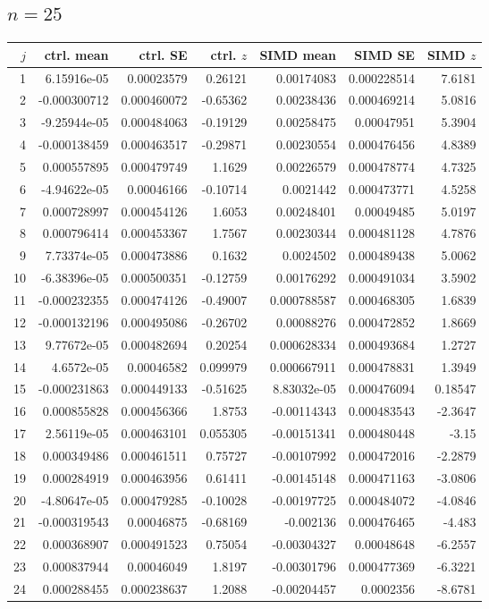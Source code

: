 \documentclass[10pt]{article}
\begin{document}
\subsection{$n=25$}
\scriptsize
\begin{longtable}{rrrrrrr}
\toprule
$j$ & ctrl. mean & ctrl. SE & ctrl. $z$ & SIMD mean & SIMD SE & SIMD $z$\\
\midrule\endhead
1 & 6.15916e-05 & 0.00023579 & 0.26121 & 0.00174083 & 0.000228514 & 7.6181 \\
2 & -0.000300712 & 0.000460072 & -0.65362 & 0.00238436 & 0.000469214 & 5.0816 \\
3 & -9.25944e-05 & 0.000484063 & -0.19129 & 0.00258475 & 0.00047951 & 5.3904 \\
4 & -0.000138459 & 0.000463517 & -0.29871 & 0.00230554 & 0.000476456 & 4.8389 \\
5 & 0.000557895 & 0.000479749 & 1.1629 & 0.00226579 & 0.000478774 & 4.7325 \\
6 & -4.94622e-05 & 0.00046166 & -0.10714 & 0.0021442 & 0.000473771 & 4.5258 \\
7 & 0.000728997 & 0.000454126 & 1.6053 & 0.00248401 & 0.00049485 & 5.0197 \\
8 & 0.000796414 & 0.000453367 & 1.7567 & 0.00230344 & 0.000481128 & 4.7876 \\
9 & 7.73374e-05 & 0.000473886 & 0.1632 & 0.0024502 & 0.000489438 & 5.0062 \\
10 & -6.38396e-05 & 0.000500351 & -0.12759 & 0.00176292 & 0.000491034 & 3.5902 \\
11 & -0.000232355 & 0.000474126 & -0.49007 & 0.000788587 & 0.000468305 & 1.6839 \\
12 & -0.000132196 & 0.000495086 & -0.26702 & 0.00088276 & 0.000472852 & 1.8669 \\
13 & 9.77672e-05 & 0.000482694 & 0.20254 & 0.000628334 & 0.000493684 & 1.2727 \\
14 & 4.6572e-05 & 0.00046582 & 0.099979 & 0.000667911 & 0.000478831 & 1.3949 \\
15 & -0.000231863 & 0.000449133 & -0.51625 & 8.83032e-05 & 0.000476094 & 0.18547 \\
16 & 0.000855828 & 0.000456366 & 1.8753 & -0.00114343 & 0.000483543 & -2.3647 \\
17 & 2.56119e-05 & 0.000463101 & 0.055305 & -0.00151341 & 0.000480448 & -3.15 \\
18 & 0.000349486 & 0.000461511 & 0.75727 & -0.00107992 & 0.000472016 & -2.2879 \\
19 & 0.000284919 & 0.000463956 & 0.61411 & -0.00145148 & 0.000471163 & -3.0806 \\
20 & -4.80647e-05 & 0.000479285 & -0.10028 & -0.00197725 & 0.000484072 & -4.0846 \\
21 & -0.000319543 & 0.00046875 & -0.68169 & -0.002136 & 0.000476465 & -4.483 \\
22 & 0.000368907 & 0.000491523 & 0.75054 & -0.00304327 & 0.00048648 & -6.2557 \\
23 & 0.000837944 & 0.00046049 & 1.8197 & -0.00301796 & 0.000477369 & -6.3221 \\
24 & 0.000288455 & 0.000238637 & 1.2088 & -0.00204457 & 0.0002356 & -8.6781 \\
\bottomrule
\end{longtable}
\end{document}

